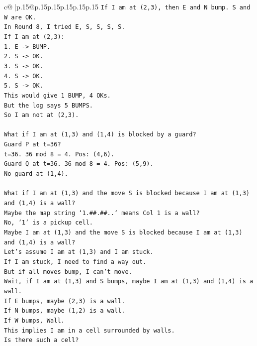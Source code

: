 \documentclass{article}
\begin{document}
{\begin{supertabular}{c@{$\;$}|p{.15\linewidth}@{}p{.15\linewidth}p{.15\linewidth}p{.15\linewidth}p{.15\linewidth}p{.15\linewidth}}
{{{\texttt{If I am at (2,3), then E and N bump. S and W are OK.} \\
\texttt{In Round 8, I tried E, S, S, S, S.} \\
\texttt{If I am at (2,3):} \\
\texttt{1. E {-}> BUMP.} \\
\texttt{2. S {-}> OK.} \\
\texttt{3. S {-}> OK.} \\
\texttt{4. S {-}> OK.} \\
\texttt{5. S {-}> OK.} \\
\texttt{This would give 1 BUMP, 4 OKs.} \\
\texttt{But the log says 5 BUMPS.} \\
\texttt{So I am not at (2,3).} \\
\\ 
\texttt{What if I am at (1,3) and (1,4) is blocked by a guard?} \\
\texttt{Guard P at t=36?} \\
\texttt{t=36. 36 mod 8 = 4. Pos: (4,6).} \\
\texttt{Guard Q at t=36. 36 mod 8 = 4. Pos: (5,9).} \\
\texttt{No guard at (1,4).} \\
\\ 
\texttt{What if I am at (1,3) and the move S is blocked because I am at (1,3) and (1,4) is a wall?} \\
\texttt{Maybe the map string `1.\#\#.\#\#..` means Col 1 is a wall?} \\
\texttt{No, '1' is a pickup cell.} \\
\texttt{Maybe I am at (1,3) and the move S is blocked because I am at (1,3) and (1,4) is a wall?} \\
\texttt{Let's assume I am at (1,3) and I am stuck.} \\
\texttt{If I am stuck, I need to find a way out.} \\
\texttt{But if all moves bump, I can't move.} \\
\texttt{Wait, if I am at (1,3) and S bumps, maybe I am at (1,3) and (1,4) is a wall.} \\
\texttt{If E bumps, maybe (2,3) is a wall.} \\
\texttt{If N bumps, maybe (1,2) is a wall.} \\
\texttt{If W bumps, Wall.} \\
\texttt{This implies I am in a cell surrounded by walls.} \\
\texttt{Is there such a cell?} \\
}}}
\end{supertabular}}
\end{document}
